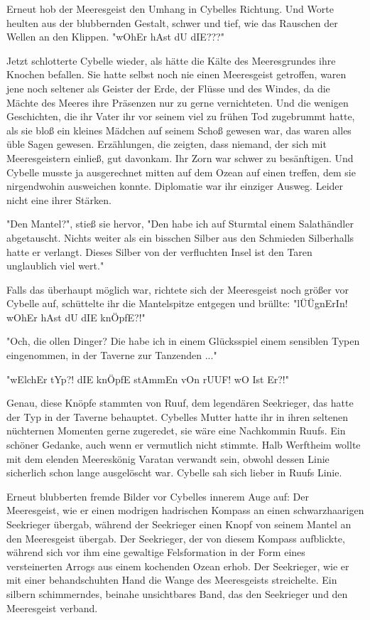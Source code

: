 Erneut hob der Meeresgeist den Umhang in Cybelles Richtung. Und Worte heulten aus der blubbernden Gestalt, schwer und tief, wie das Rauschen der Wellen an den Klippen. "wOhEr hAst dU dIE???"

Jetzt schlotterte Cybelle wieder, als hätte die Kälte des Meeresgrundes ihre Knochen befallen. Sie hatte selbst noch nie einen Meeresgeist getroffen, waren jene noch seltener als Geister der Erde, der Flüsse und des Windes, da die Mächte des Meeres ihre Präsenzen nur zu gerne vernichteten. Und die wenigen Geschichten, die ihr Vater ihr vor seinem viel zu frühen Tod zugebrummt hatte, als sie bloß ein kleines Mädchen auf seinem Schoß gewesen war, das waren alles üble Sagen gewesen. Erzählungen, die zeigten, dass niemand, der sich mit Meeresgeistern einließ, gut davonkam. Ihr Zorn war schwer zu besänftigen. Und Cybelle musste ja ausgerechnet mitten auf dem Ozean auf einen treffen, dem sie nirgendwohin ausweichen konnte. Diplomatie war ihr einziger Ausweg. Leider nicht eine ihrer Stärken.

"Den Mantel?", stieß sie hervor, "Den habe ich auf Sturmtal einem Salathändler abgetauscht. Nichts weiter als ein bisschen Silber aus den Schmieden Silberhalls hatte er verlangt. Dieses Silber von der verfluchten Insel ist den Taren unglaublich viel wert."

Falls das überhaupt möglich war, richtete sich der Meeresgeist noch größer vor Cybelle auf, schüttelte ihr die Mantelspitze entgegen und brüllte: "lÜÜgnErIn! wOhEr hAst dU dIE knÖpfE?!"

"Och, die ollen Dinger? Die habe ich in einem Glücksspiel einem sensiblen Typen eingenommen, in der Taverne zur Tanzenden ..."

"wElchEr tYp?! dIE knÖpfE stAmmEn vOn rUUF! wO Ist Er?!"

Genau, diese Knöpfe stammten von Ruuf, dem legendären Seekrieger, das hatte der Typ in der Taverne behauptet. Cybelles Mutter hatte ihr in ihren seltenen nüchternen Momenten gerne zugeredet, sie wäre eine Nachkommin Ruufs. Ein schöner Gedanke, auch wenn er vermutlich nicht stimmte. Halb Werftheim wollte mit dem elenden Meereskönig Varatan verwandt sein, obwohl dessen Linie sicherlich schon lange ausgelöscht war. Cybelle sah sich lieber in Ruufs Linie.

Erneut blubberten fremde Bilder vor Cybelles innerem Auge auf: Der Meeresgeist, wie er einen modrigen hadrischen Kompass an einen schwarzhaarigen Seekrieger übergab, während der Seekrieger einen Knopf von seinem Mantel an den Meeresgeist übergab. Der Seekrieger, der von diesem Kompass aufblickte, während sich vor ihm eine gewaltige Felsformation in der Form eines versteinerten Arrogs aus einem kochenden Ozean erhob. Der Seekrieger, wie er mit einer behandschuhten Hand die Wange des Meeresgeists streichelte. Ein silbern schimmerndes, beinahe unsichtbares Band, das den Seekrieger und den Meeresgeist verband.

